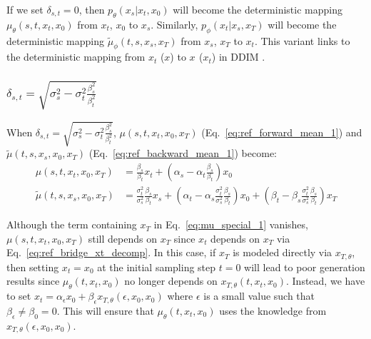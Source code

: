 If we set $\delta_{s,t}=0$, then $p_{\theta}\left(x_{s}|x_{t},x_{0}\right)$
will become the deterministic mapping $\mu_{\theta}\left(s,t,x_{t},x_{0}\right)$
from $x_{t}$, $x_{0}$ to $x_{s}$. Similarly, $p_{\phi}\left(x_{t}|x_{s},x_{T}\right)$
will become the deterministic mapping $\tilde{\mu}_{\phi}\left(t,s,x_{s},x_{T}\right)$
from $x_{s}$, $x_{T}$ to $x_{t}$. This variant links to the deterministic
mapping from $x_{t}$ ($x$) to $x_{}$ ($x_{t}$) in DDIM \cite{song2020denoising}.

\subsubsection{$\delta_{s,t}=\sqrt{\sigma_{s}^{2}-\sigma_{t}^{2}\frac{\beta_{s}^{2}}{\beta_{t}^{2}}}$}

When $\delta_{s,t}=\sqrt{\sigma_{s}^{2}-\sigma_{t}^{2}\frac{\beta_{s}^{2}}{\beta_{t}^{2}}}$,
$\mu\left(s,t,x_{t},x_{0},x_{T}\right)$ (Eq.~\ref{eq:ref_forward_mean_1})
and $\tilde{\mu}\left(t,s,x_{s},x_{0},x_{T}\right)$ (Eq.~\ref{eq:ref_backward_mean_1})
become:
\begin{align}
\mu\left(s,t,x_{t},x_{0},x_{T}\right) & =\frac{\beta_{s}}{\beta_{t}}x_{t}+\left(\alpha_{s}-\alpha_{t}\frac{\beta_{s}}{\beta_{t}}\right)x_{0}\label{eq:mu_special_1}\\
\tilde{\mu}\left(t,s,x_{s},x_{0},x_{T}\right) & =\frac{\sigma_{t}^{2}}{\sigma_{s}^{2}}\frac{\beta_{s}}{\beta_{t}}x_{s}+\left(\alpha_{t}-\alpha_{s}\frac{\sigma_{t}^{2}}{\sigma_{s}^{2}}\frac{\beta_{s}}{\beta_{t}}\right)x_{0}+\left(\beta_{t}-\beta_{s}\frac{\sigma_{t}^{2}}{\sigma_{s}^{2}}\frac{\beta_{s}}{\beta_{t}}\right)x_{T}\label{eq:mu_tilde_special_1}
\end{align}

Although the term containing $x_{T}$ in Eq.~\ref{eq:mu_special_1}
vanishes, $\mu\left(s,t,x_{t},x_{0},x_{T}\right)$ still depends on
$x_{T}$ since $x_{t}$ depends on $x_{T}$ via Eq.~\ref{eq:ref_bridge_xt_decomp}.
In this case, if $x_{T}$ is modeled directly via $x_{T,\theta}$,
then setting $x_{t}=x_{0}$ at the initial sampling step $t=0$ will
lead to poor generation results since $\mu_{\theta}\left(t,x_{t},x_{0}\right)$
no longer depends on $x_{T,\theta}\left(t,x_{t},x_{0}\right)$. Instead,
we have to set $x_{t}=\alpha_{\epsilon}x_{0}+\beta_{\epsilon}x_{T,\theta}\left(\epsilon,x_{0},x_{0}\right)$
where $\epsilon$ is a small value such that $\beta_{\epsilon}\neq\beta_{0}=0$.
This will ensure that $\mu_{\theta}\left(t,x_{t},x_{0}\right)$ uses
the knowledge from $x_{T,\theta}\left(\epsilon,x_{0},x_{0}\right)$. 

